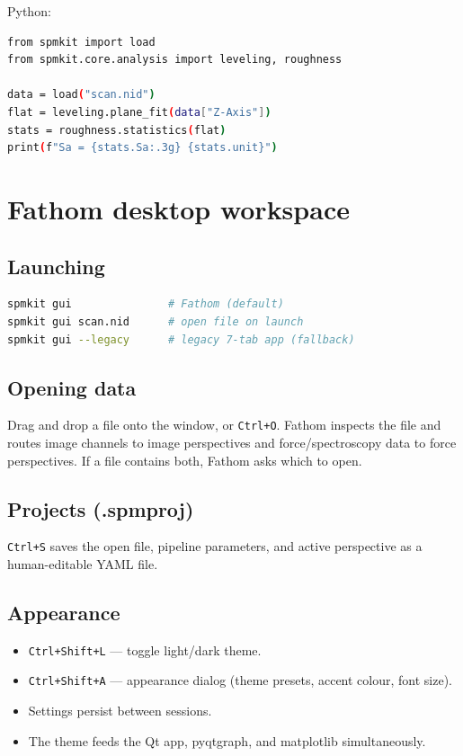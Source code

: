 \documentclass[a4paper,11pt]{article}
\begin{document}
Python:

\begin{lstlisting}[language=bash]
from spmkit import load
from spmkit.core.analysis import leveling, roughness

data = load("scan.nid")
flat = leveling.plane_fit(data["Z-Axis"])
stats = roughness.statistics(flat)
print(f"Sa = {stats.Sa:.3g} {stats.unit}")
\end{lstlisting}

\section{Fathom desktop workspace}

\subsection{Launching}
\begin{lstlisting}[language=bash]
spmkit gui               # Fathom (default)
spmkit gui scan.nid      # open file on launch
spmkit gui --legacy      # legacy 7-tab app (fallback)
\end{lstlisting}

\subsection{Opening data}
Drag and drop a file onto the window, or \texttt{Ctrl+O}. Fathom inspects the file and
routes image channels to image perspectives and force/spectroscopy data to force perspectives.
If a file contains both, Fathom asks which to open.

\subsection{Projects (.spmproj)}
\texttt{Ctrl+S} saves the open file, pipeline parameters, and active perspective as a
human-editable YAML file.

\subsection{Appearance}
\begin{itemize}[nosep]
  \item \texttt{Ctrl+Shift+L} --- toggle light/dark theme.
  \item \texttt{Ctrl+Shift+A} --- appearance dialog (theme presets, accent colour, font size).
  \item Settings persist between sessions.
  \item The theme feeds the Qt app, pyqtgraph, and matplotlib simultaneously.
\end{itemize}
\end{document}
